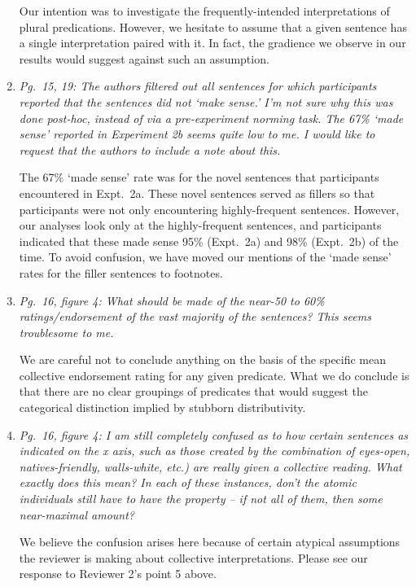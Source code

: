 \documentclass[12pt]{article}
\begin{document}
\begin{enumerate}
Our intention was to investigate the frequently-intended interpretations of plural predications. However, we hesitate to assume that a given sentence has a single interpretation paired with it. In fact, the gradience we observe in our results would suggest against such an assumption.

\item \emph{Pg.~15, 19: The authors filtered out all sentences for which participants reported that the sentences did not `make sense.' I'm not sure why this was done post-hoc, instead of via a pre-experiment norming task. The 67\% `made sense' reported in Experiment 2b seems quite low to me. I would like to request that the authors to include a note about this.}

The 67\% `made sense' rate was for the novel sentences that participants encountered in Expt.~2a. These novel sentences served as fillers so that participants were not only encountering highly-frequent sentences. However, our analyses look only at the highly-frequent sentences, and participants indicated that these made sense 95\% (Expt.~2a) and 98\% (Expt.~2b) of the time. To avoid confusion, we have moved our mentions of the `made sense' rates for the filler sentences to footnotes.

\item \emph{Pg.~16, figure 4: What should be made of the near-50 to 60\% ratings/endorsement of the vast majority of the sentences? This seems troublesome to me.}

We are careful not to conclude anything on the basis of the specific mean collective endorsement rating for any given predicate. What we do conclude is that there are no clear groupings of predicates that would suggest the categorical distinction implied by stubborn distributivity.

\item \emph{Pg.~16, figure 4: I am still completely confused as to how certain sentences as indicated on the x axis, such as those created by the combination of eyes-open, natives-friendly, walls-white, etc.) are really given a collective reading. What exactly does this mean? In each of these instances, don’t the atomic individuals still have to have the property – if not all of them, then some near-maximal amount?}

We believe the confusion arises here because of certain atypical assumptions the reviewer is making about collective interpretations. Please see our response to Reviewer 2's point 5 above.


\end{enumerate}
\end{document}
